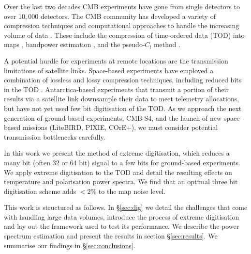 \documentclass[apj]{emulateapj}
\begin{document}

Over the last two decades CMB experiments have gone from single detectors to over $10,000$ detectors. The CMB community has developed a variety of compression techniques and computational approaches to handle the increasing volume of data \citep{tristam2007}. These include the compression of time-ordered data (TOD) into maps \citep{tegmark1997}, bandpower estimation \citep{tegmark1998}, and the pseudo-$C_l$ method \citep{brown2005}.

A potential hurdle for experiments at remote locations are the transmission limitations of satellite links. Space-based experiments have employed a combination of lossless and lossy compression techniques, including reduced bits in the TOD \citep{gaztanaga1998, maris2003}. Antarctica-based experiments that transmit a portion of their results via a satellite link downsample their data to meet telemetry allocations, but have not yet used few bit digitisation of the TOD. As we approach the next generation of ground-based experiments, CMB-S4, and the launch of new space-based missions (LiteBIRD, PIXIE, COrE+), we must consider potential transmission bottlenecks carefully. %

In this work we present the method of extreme digitisation, which reduces a many bit (often 32 or 64 bit) signal to a few bits for ground-based experiments. We apply extreme digitisation to the TOD and detail the resulting effects on temperature and polarisation power spectra. We find that an optimal three bit digitisation scheme adds $<2\%$ to the map noise level.

This work is structured as follows. In \S\ref{sec:dig} we detail the challenges that come with handling large data volumes, introduce the process of extreme digitisation and lay out the framework used to test its performance. We describe the power spectrum estimation and present the results in section \S\ref{sec:results}. We summarise our findings in \S\ref{sec:conclusions}.

\end{document}
